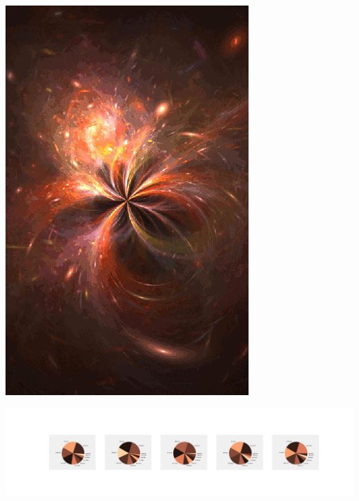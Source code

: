 \documentclass[11pt]{article}
\begin{document}
\begin{landscape}
    \begin{center}
    \includegraphics[width=\textwidth]{./nbimg/file (140).jpg}
    \end{center}

    \begin{center}
    \includegraphics[width=250mm]{./nbimg/pie-46.jpg}
    \end{center}


\end{landscape}
\end{document}
